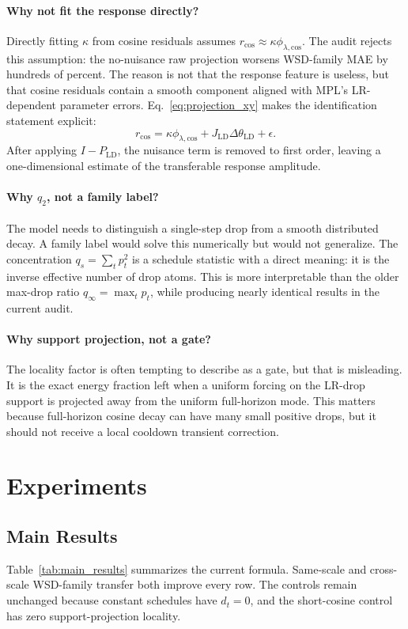 \documentclass{article}
\newcommand{\LD}{\mathrm{LD}}
\newcommand{\cosine}{\mathrm{cos}}
\begin{document}
\paragraph{Why not fit the response directly?}
Directly fitting \(\kappa\) from cosine residuals assumes
\(r_{\cosine}\approx\kappa\phi_{\lambda,\cosine}\).  The audit rejects this assumption:
the no-nuisance raw projection worsens WSD-family MAE by hundreds of percent.  The reason is
not that the response feature is useless, but that cosine residuals contain a smooth component
aligned with MPL's LR-dependent parameter errors.  Eq.~\eqref{eq:projection_xy} makes the
identification statement explicit:
\begin{equation}
  r_{\cosine}
  =
  \kappa\phi_{\lambda,\cosine}
  +J_{\LD}\Delta\theta_{\LD}
  +\epsilon .
\end{equation}
After applying \(I-P_{\LD}\), the nuisance term is removed to first order, leaving a
one-dimensional estimate of the transferable response amplitude.

\paragraph{Why \(q_2\), not a family label?}
The model needs to distinguish a single-step drop from a smooth distributed decay.  A family
label would solve this numerically but would not generalize.  The concentration
\(q_s=\sum_t p_t^2\) is a schedule statistic with a direct meaning: it is the inverse
effective number of drop atoms.  This is more interpretable than the older max-drop ratio
\(q_\infty=\max_t p_t\), while producing nearly identical results in the current audit.

\paragraph{Why support projection, not a gate?}
The locality factor is often tempting to describe as a gate, but that is misleading.  It is
the exact energy fraction left when a uniform forcing on the LR-drop support is projected
away from the uniform full-horizon mode.  This matters because full-horizon cosine decay can
have many small positive drops, but it should not receive a local cooldown transient
correction.

\section{Experiments}
\subsection{Main Results}
Table~\ref{tab:main_results} summarizes the current formula.  Same-scale and cross-scale
WSD-family transfer both improve every row.  The controls remain unchanged because constant
schedules have \(d_t=0\), and the short-cosine control has zero support-projection locality.
\end{document}
